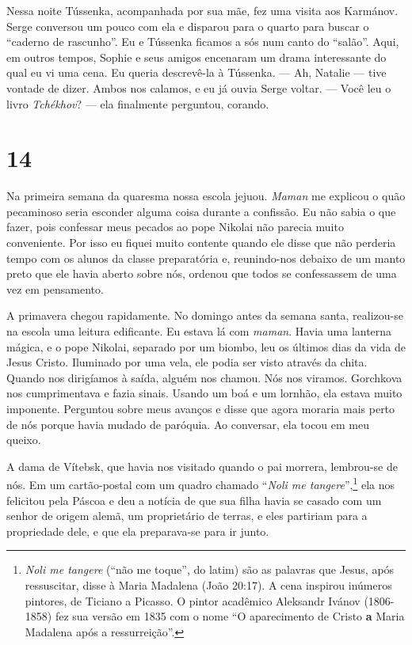 Nessa noite Tússenka, acompanhada por sua mãe, fez uma visita aos
Karmánov. Serge conversou um pouco com ela e disparou para o quarto para
buscar o ``caderno de rascunho''. Eu e Tússenka ficamos a sós num canto
do ``salão''. Aqui, em outros tempos, Sophie e seus amigos encenaram um
drama interessante do qual eu vi uma cena. Eu queria descrevê-la à
Tússenka. --- Ah, Natalie --- tive vontade de dizer. Ambos nos calamos,
e eu já ouvia Serge voltar. --- Você leu o livro \emph{Tchékhov}? --- ela
finalmente perguntou, corando.

\section{14}

Na primeira semana da quaresma nossa escola jejuou. \emph{Maman} me
explicou o quão pecaminoso seria esconder alguma coisa durante a
confissão. Eu não sabia o que fazer, pois confessar meus pecados ao pope
Nikolai não parecia muito conveniente. Por isso eu fiquei muito contente
quando ele disse que não perderia tempo com os alunos da classe
preparatória e, reunindo-nos debaixo de um manto preto que ele havia
aberto sobre nós, ordenou que todos se confessassem de uma vez em
pensamento.

A primavera chegou rapidamente. No domingo antes da semana santa,
realizou-se na escola uma leitura edificante. Eu estava lá com
\emph{maman}. Havia uma lanterna mágica, e o pope Nikolai, separado por
um biombo, leu os últimos dias da vida de Jesus Cristo. Iluminado por
uma vela, ele podia ser visto através da chita. Quando nos dirigíamos à
saída, alguém nos chamou. Nós nos viramos. Gorchkova nos cumprimentava e
fazia sinais. Usando um boá e um lornhão, ela estava muito imponente.
Perguntou sobre meus avanços e disse que agora moraria mais perto de nós
porque havia mudado de paróquia. Ao conversar, ela tocou em meu queixo.

A dama de Vítebsk, que havia nos visitado quando o pai morrera,
lembrou-se de nós. Em um cartão-postal com um quadro chamado
``\emph{Noli me tangere}'',\footnote{\emph{Noli me tangere} (``não me
  toque'', do latim) são as palavras que Jesus, após ressuscitar, disse
  à Maria Madalena (João 20:17). A cena inspirou inúmeros pintores, de
  Ticiano a Picasso. O pintor acadêmico Aleksandr Ivánov (1806-1858) fez
  sua versão em 1835 com o nome ``O aparecimento de Cristo \textbf{a}
  Maria Madalena após a ressurreição''.} ela nos felicitou pela Páscoa e
deu a notícia de que sua filha havia se casado com um senhor de origem
alemã, um proprietário de terras, e eles partiriam para a propriedade
dele, e que ela preparava-se para ir junto.

